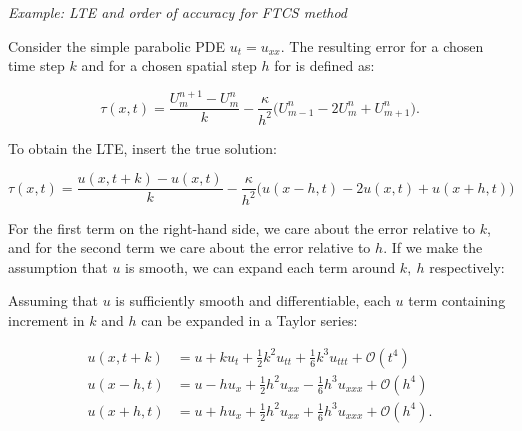 
% 


\vspace{0.5cm}
\begin{tcolorbox}[colback=gray!5!white,colframe=gray!75!black]
\noindent\textit{Example: LTE and order of accuracy for FTCS method}

Consider the simple parabolic PDE $u_t = u_{xx}$. The resulting error for a chosen time step $k$ and for a chosen spatial step $h$ for  is defined as:


\begin{equation}
    \tau(x, t) = \frac{U_{m}^{n+1} - U_{m}^{n}}{k} - \frac{\kappa}{h^2}\big(U_{m-1}^{n} - 2 U_{m}^{n} + U_{m+1}^{n}\big). 
\end{equation}

To obtain the LTE, insert the true solution: 

\begin{equation}\label{eq:ftcs_lte}
    \tau(x, t) = \frac{u(x, t+k) - u(x, t)}{k} - \frac{\kappa}{h^2}\big(u(x-h, t) - 2 u(x, t) + u(x+h, t)\big)
\end{equation}

For the first term on the right-hand side, we care about the error relative to $k$, and for the second term we care about the error relative to $h$. If we make the assumption that $u$ is smooth, we can expand each term around $k, \ h$ respectively: 

Assuming that $u$ is sufficiently smooth and differentiable, each $u$ term containing increment in $k$ and $h$ can be expanded in a Taylor series: 

\begin{align}%
    u(x, t+k) &= u + k u_t + \frac{1}{2} k^2 u_{tt} + \frac{1}{6} k^3 u_{ttt} + \mathcal{O}(t^4) \label{eq:ftcs_expand1}\\
    u(x-h, t) &= u - h u_x + \frac{1}{2} h^2 u_{xx} - \frac{1}{6} h^3 u_{xxx} + \mathcal{O}(h^4) \label{eq:ftcs_expand2}\\
    u(x+h, t) &= u + h u_x + \frac{1}{2} h^2 u_{xx} + \frac{1}{6} h^3 u_{xxx} + \mathcal{O}(h^4)\label{eq:ftcs_expand3}. 
\end{align}


\end{tcolorbox}
